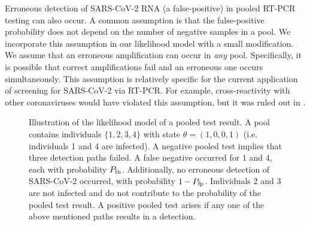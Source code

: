 \documentclass{article}
\begin{document}
Erroneous detection of SARS-CoV-2 RNA (a false-positive) in pooled
RT-PCR testing can also occur. A common assumption \cite{Simplistic1,
  Simplistic2, Kim, OptimalDorfmanPool} is that the false-positive
probability does not depend on the number of negative samples in a
pool. We incorporate this assumption in our likelihood model with a
small modification. We assume that an erroneous amplification can
occur in \emph{any} pool. Specifically, it is possible that correct
amplifications fail and an erroneous one occurs simultaneously. This
assumption is relatively specific for the current application of
screening for SARS-CoV-2 via RT-PCR.  For example, cross-reactivity
with other coronaviruses would have violated this assumption, but it
was ruled out in \cite{KitComparison}.

\begin{figure}[H]
  \centering
  \caption{Illustration of the likelihood model of a pooled test
    result. A pool contains individuals $\{1,2,3,4\}$ with state
    $\theta=(1,0,0,1)$ (i.e. individuals 1 and 4 are infected). A
    negative pooled test implies that three detection paths failed. A
    false negative occurred for $1$ and $4$, each with probability
    $P_{\text{fn}}$. Additionally, no erroneous detection of SARS-CoV-2
    occurred, with probability $1-P_{\text{fp}}$. Individuals $2$ and $3$ are
    not infected and do not contribute to the probability of the
    pooled test result. A positive pooled test arises if any one of
    the above mentioned paths results in a
    detection.}\label{fig:likelihood}
\end{figure}
\end{document}
